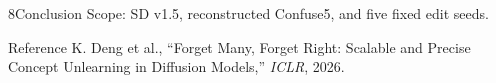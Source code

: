 \documentclass[final]{beamer}
\newlength{\sepwidth}
\newlength{\colwidth}
\newcommand{\separatorcolumn}{\begin{column}{\sepwidth}\end{column}}
\newcommand{\smalltext}{\fontsize{20}{24}\selectfont}
\newcommand{\blocktext}{\RaggedRight\setlength{\parindent}{0pt}\noindent}
\begin{document}
\begin{frame}[t]
\begin{columns}[t,totalwidth=\paperwidth]
\begin{column}{\colwidth}
\begin{alertblock}{8\quad Conclusion}
\smalltext
Scope: SD v1.5, reconstructed Confuse5, and five fixed edit seeds.
\end{alertblock}

\begin{block}{Reference}
\blocktext
\smalltext
K. Deng et al., ``Forget Many, Forget Right: Scalable and Precise Concept Unlearning in Diffusion Models,'' \emph{ICLR}, 2026.
\end{block}

\end{column}
\separatorcolumn

\end{columns}
\end{frame}
\end{document}
